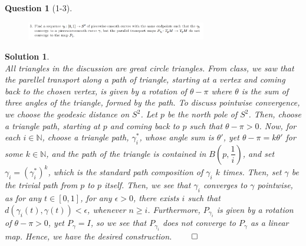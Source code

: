 \documentclass[11pt]{article}
\theoremstyle{plain}
\theoremstyle{quest}
\newtheorem*{question}{Question}
\newtheorem*{solution}{Solution}
\begin{document}
\newpage

\begin{question}[1-3]
\hfill
\begin{figure}[h!]
  \centering
    \includegraphics[width=0.7\textwidth]{geoII-s2-p3.png}
\end{figure}
\end{question}
\begin{solution} \hfill \\
All triangles in the discussion are great circle triangles.
From class, we saw that the parellel transport along a path of triangle, starting 
at a vertex and coming back to the chosen vertex, is given by a rotation of
$\theta - \pi$ where $\theta$ is the sum of three angles of the triangle, formed 
by the path. To discuss pointwise convergence, we choose the geodesic distance 
on $S^2$. Let $p$ be the north pole of $S^2$. Then, choose a triangle path, starting
at $p$ and coming back to $p$ such that $\theta - \pi > 0$. Now, for each $i \in 
\mathbb{N}$, choose a triangle path, $\gamma_{i}^{*}$, 
whose angle sum is $\theta'$, yet $\theta - \pi
= k \theta'$ for some $k \in \mathbb{N}$, and the path of the triangle is contained 
in $B(p,\dfrac{1}{i})$, and set $\gamma_i = (\gamma_i^*)^k$, which is the standard
path composition of $\gamma_i$ $k$ times.  Then, set $\gamma$
be the trivial path from $p$ to $p$ itself. Then, we see that $\gamma_i$ converges
to $\gamma$ pointwise, as for any $t \in [0,1]$, for any $\epsilon > 0$,
there exists $i$ such that $d(\gamma_i(t),\gamma(t)) < \epsilon$, whenever
$n \geq i$. Furthermore, $P_{\gamma_i}$ is given by a rotation of $\theta - \pi > 0$,
yet $P_{\gamma} = I$, so we see that $P_{\gamma_i}$ does not converge to $P_{\gamma}$
as a linear map. Hence, we have the desired construction. \hfill $\qed$ 
\end{solution}

\newpage
\end{document}
